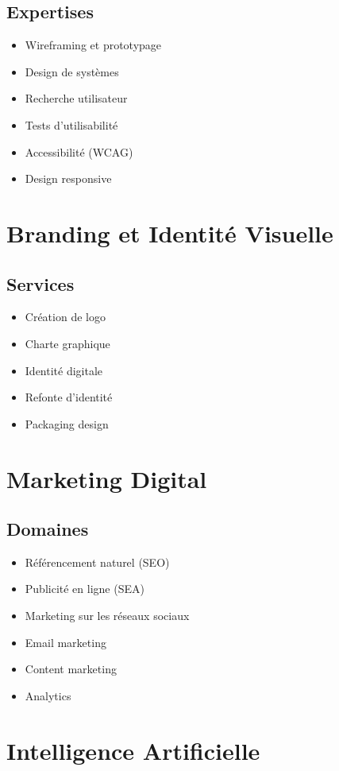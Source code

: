 \documentclass[12pt,a4paper,oneside]{book}
\begin{document}
\section{Expertises}
\begin{itemize}
\item Wireframing et prototypage
\item Design de systèmes
\item Recherche utilisateur
\item Tests d'utilisabilité
\item Accessibilité (WCAG)
\item Design responsive
\end{itemize}

\chapter{Branding et Identité Visuelle}

\section{Services}
\begin{itemize}
\item Création de logo
\item Charte graphique
\item Identité digitale
\item Refonte d'identité
\item Packaging design
\end{itemize}

\chapter{Marketing Digital}

\section{Domaines}
\begin{itemize}
\item Référencement naturel (SEO)
\item Publicité en ligne (SEA)
\item Marketing sur les réseaux sociaux
\item Email marketing
\item Content marketing
\item Analytics
\end{itemize}

\chapter{Intelligence Artificielle}
\end{document}

